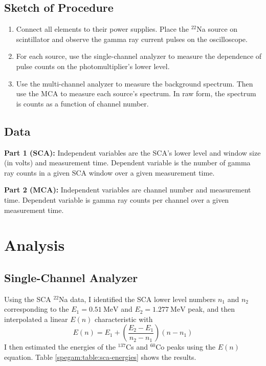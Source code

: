 \documentclass[11pt, a4paper]{article}
\newcommand{\isoptope}[2]{${}^{#2}${#1}}
\begin{document}
\subsection{Sketch of Procedure}
\begin{enumerate}
	\item Connect all elements to their power supplies. Place the \isoptope{Na}{22} source on scintillator and observe the gamma ray current pulses on the oscilloscope. 
	
	\item For each source, use the single-channel analyzer to measure the dependence of pulse counts on the photomultiplier's lower level.
	
	\item Use the multi-channel analyzer to measure the background spectrum. Then use the MCA to measure each source's spectrum. In raw form, the spectrum is counts as a function of channel number. 
	
\end{enumerate}


\subsection{Data}
\textbf{Part 1 (SCA):} Independent variables are the SCA's lower level and window size (in volts) and measurement time. Dependent variable is the number of gamma ray counts in a given SCA window over a given measurement time.

\vspace{2mm}
\textbf{Part 2 (MCA):} Independent variables are channel number and measurement time. Dependent variable is gamma ray counts per channel over a given measurement time.


\section{Analysis}
\subsection{Single-Channel Analyzer}
Using the SCA \isoptope{Na}{22} data, I identified the SCA lower level numbers $ n_{1} $ and $ n_{2} $ corresponding to the  $ E_{1} = \SI{0.51}{\mega \electronvolt} $ and $ E_{2} = \SI{1.277}{\mega \electronvolt} $ peak, and then interpolated a linear $ E(n) $ characteristic with
\begin{equation*}
	E(n) = E_{1} + \left(\frac{E_{2}-E_{1}}{n_{2}-n_{1}}\right)(n - n_{1})
\end{equation*}
I then estimated the energies of the \isoptope{Cs}{137} and \isoptope{Co}{60} peaks using the $ E(n) $ equation. Table \ref{spegam:table:sca-energies} shows the results.
\end{document}
